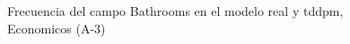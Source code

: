 \begin{figure}[H]
    \centering
    
    \caption{Frecuencia del campo Bathrooms en el modelo real y tddpm, Economicos (A-3)}
    \label{frecuency-Bathrooms-tddpm_mlp}
\end{figure}